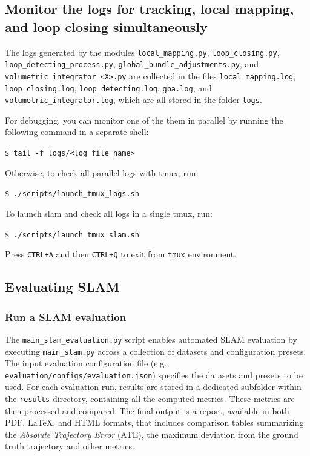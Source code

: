 \documentclass{article}
\newenvironment{Shaded}{\begin{snugshade}}{\end{snugshade}}
\newcommand{\BuiltInTok}[1]{\textcolor[rgb]{0.74,0.68,0.62}{#1}}
\newcommand{\ExtensionTok}[1]{\textcolor[rgb]{0.74,0.68,0.62}{#1}}
\newcommand{\NormalTok}[1]{\textcolor[rgb]{0.74,0.68,0.62}{#1}}
\newcommand{\codeline}[1]{\texttt{\NormalTok{\$ }\BuiltInTok{\ExtensionTok{#1}}}}
\newenvironment{codeblock}
{
\begin{scriptsize}
\begin{Shaded}
}
{
\end{Shaded}
\end{scriptsize}
}
\begin{document}
\hypertarget{monitor-the-logs-for-tracking-local-mapping-and-loop-closing-simultaneously}{%
\subsection{Monitor the logs for tracking, local mapping, and loop
closing
simultaneously}\label{monitor-the-logs-for-tracking-local-mapping-and-loop-closing-simultaneously}}

The logs generated by the modules \texttt{local\_mapping.py},
\texttt{loop\_closing.py}, \texttt{loop\_detecting\_process.py},
\texttt{global\_bundle\_adjustments.py}, and
\texttt{volumetric\ integrator\_\textless{}X\textgreater{}.py} are
collected in the files \texttt{local\_mapping.log},
\texttt{loop\_closing.log}, \texttt{loop\_detecting.log},
\texttt{gba.log}, and \texttt{volumetric\_integrator.log}, which are all
stored in the folder \texttt{logs}. 

For debugging, you can monitor one
of the them in parallel by running the following command in a separate
shell:\\
\begin{codeblock}
\codeline{tail\ -f\ logs/\textless{}log\ file\ name\textgreater{}}
\end{codeblock}
Otherwise, to check all parallel logs with tmux, run:\\
\begin{codeblock}
\codeline{./scripts/launch\_tmux\_logs.sh}
\end{codeblock}
To launch slam and check all logs in a single tmux, run:\\
\begin{codeblock}
\codeline{./scripts/launch\_tmux\_slam.sh}
\end{codeblock}
Press \texttt{CTRL+A} and then \texttt{CTRL+Q} to exit from
\texttt{tmux} environment.

\hypertarget{evaluating-slam}{%
\subsection{Evaluating SLAM}\label{evaluating-slam}}

\hypertarget{run-a-slam-evaluation}{%
\subsubsection{Run a SLAM evaluation}\label{run-a-slam-evaluation}}

The \texttt{main\_slam\_evaluation.py} script enables automated SLAM
evaluation by executing \texttt{main\_slam.py} across a collection of
datasets and configuration presets. The input evaluation configuration
file (e.g., \texttt{evaluation/configs/evaluation.json}) specifies the
datasets and presets to be used. For each evaluation run, results are
stored in a dedicated subfolder within the \texttt{results} directory,
containing all the computed metrics. These metrics are then processed
and compared. The final output is a report, available in both PDF,
LaTeX, and HTML formats, that includes comparison tables summarizing the
\emph{Absolute Trajectory Error} (ATE), the maximum deviation from the
ground truth trajectory and other metrics.
\end{document}
